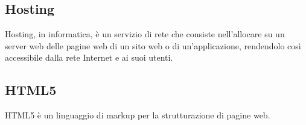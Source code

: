 
\subsection*{Hosting}
Hosting, in informatica, è un servizio di rete che consiste nell'allocare su un server web delle pagine web di un sito web o di un'applicazione, rendendolo così accessibile dalla rete Internet e ai suoi utenti.

\subsection*{HTML5}
HTML5 è un linguaggio di markup per la strutturazione di pagine web.


